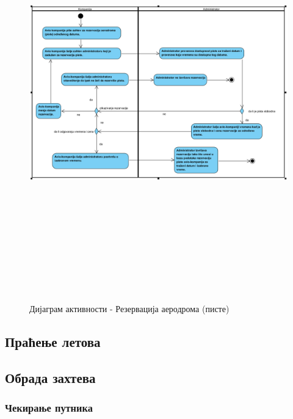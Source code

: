 \documentclass{article}
\begin{document}
\newpage
\begin{figure}[H]
    \centering
    \includegraphics[width=1.1\textwidth, height=18cm]{Dijagrami_slike/rezervacija_aerodroma.png}
    \caption{Дијаграм активности - Резервација аеродрома (писте)}
\end{figure}

\subsection{Праћење летова}

\subsection{Обрада захтева}

\subsubsection{Чекирање путника}
\end{document}
